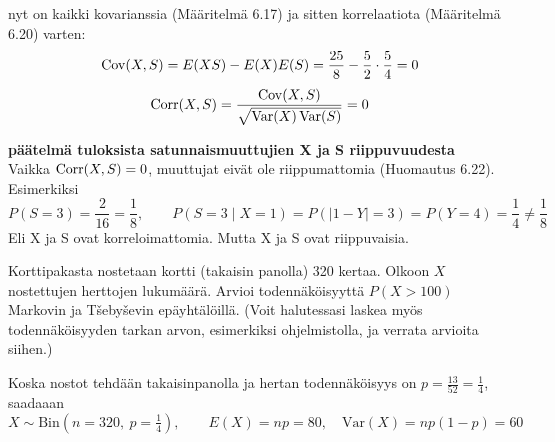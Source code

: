 \documentclass[12pt,a4paper]{article}
\begin{document}
\pagebreak
nyt on kaikki kovarianssia (Määritelmä 6.17) ja sitten korrelaatiota (Määritelmä 6.20) varten:
\[
\operatorname{Cov}(X,S)=E(XS)-E(X)E(S)
=\frac{25}{8}-\frac52\cdot\frac54=0
\]
\[
\operatorname{Corr}(X,S)=\frac{\operatorname{Cov}(X,S)}{\sqrt{\operatorname{Var}(X)\operatorname{Var}(S)}}=0
\]

\vspace{0.8cm}

\textbf{päätelmä tuloksista satunnaismuuttujien X ja S riippuvuudesta}\\

Vaikka $\operatorname{Corr}(X,S)=0$, muuttujat eivät ole riippumattomia (Huomautus 6.22).\\

Esimerkiksi
\[
P(S=3)=\frac{2}{16}=\frac18,\qquad
P(S=3\mid X=1)=P(|1-Y|=3)=P(Y=4)=\frac14\neq \frac18
\]
Eli X ja S ovat korreloimattomia. Mutta X ja S ovat riippuvaisia.


\pagebreak
{}
Korttipakasta nostetaan kortti (takaisin panolla) 320 kertaa. Olkoon $X$ nostettujen herttojen lukumäärä. Arvioi todennäköisyyttä $P(X>100)$ Markovin ja T\v seby\v sevin epäyhtälöillä. (Voit halutessasi laskea myös todennäköisyyden tarkan arvon, esimerkiksi ohjelmistolla, ja verrata arvioita siihen.)

\vspace{0.4cm}

Koska nostot tehdään takaisinpanolla ja hertan todennäköisyys on $p=\tfrac{13}{52}=\tfrac14$, saadaaan
\[
X\sim\mathrm{Bin}(n=320,\ p=\tfrac14),\qquad
E(X)=np=80,\quad
\mathrm{Var}(X)=np(1-p)=60
\]
\end{document}
